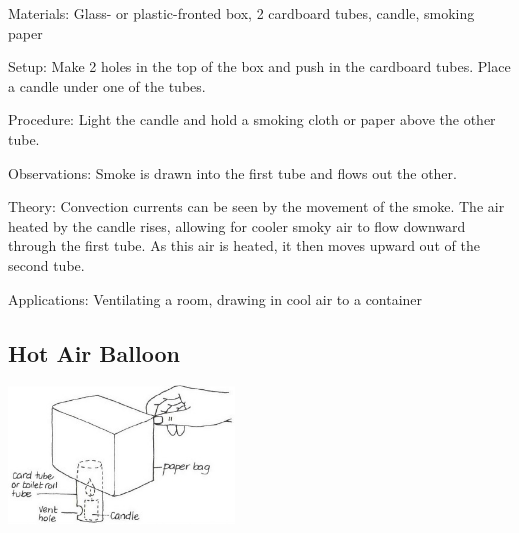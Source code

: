 \begin{multicols}{2}
\begin{description*}
\item[Materials:]{Glass- or plastic-fronted box, 2 cardboard tubes, candle, smoking paper}
\item[Setup:]{Make 2 holes in the top of the box and push in the cardboard tubes. Place a candle under one of the tubes.}
\item[Procedure:]{Light the candle and hold a smoking cloth or paper above the other tube.}
\item[Observations:]{Smoke is drawn into the first tube and flows out the other.}
\item[Theory:]{Convection currents can be seen by the movement of the smoke. The air heated by the candle rises, allowing for cooler smoky air to flow downward through the first tube. As this air is heated, it then moves upward out of the second tube.}
\item[Applications:]{Ventilating a room, drawing in cool air to a container}
\end{description*}

\subsection{Hot Air Balloon}

\begin{center}
\includegraphics[width=0.45\textwidth]{./img/vso/hot-air-balloon.jpg}
\end{center}


\end{multicols}
